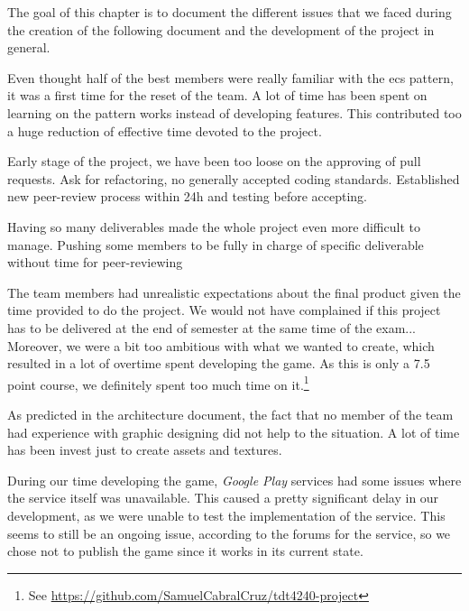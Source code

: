 The goal of this chapter is to document the different issues that we faced during the creation of the following document and the development of the project in general.

Even thought half of the best members were really familiar with the \gls{ecs} pattern, it was a first time for the reset of the team. A lot of time has been spent on learning on the pattern works instead of developing features. This contributed too a huge reduction of effective time devoted to the project.

Early stage of the project, we have been too loose on the approving of pull requests. Ask for refactoring, no generally accepted coding standards. Established new peer-review process within 24h and testing before accepting.

Having so many deliverables made the whole project even more difficult to manage. Pushing some members to be fully in charge of specific deliverable without time for peer-reviewing

The team members had unrealistic expectations about the final product given the time provided to do the project. We would not have complained if this project has to be delivered at the end of semester at the same time of the exam... Moreover, we were a bit too ambitious with what we wanted to create, which resulted in a lot of overtime spent developing the game. As this is only a 7.5 point course, we definitely spent too much time on it.\footnote{See \url{https://github.com/SamuelCabralCruz/tdt4240-project}}

As predicted in the architecture document, the fact that no member of the team had experience with graphic designing did not help to the situation. A lot of time has been invest just to create assets and textures.

During our time developing the game, \textit{Google Play} services had some issues where the service itself was unavailable. This caused a pretty significant delay in our development, as we were unable to test the implementation of the service. This seems to still be an ongoing issue, according to the forums for the service, so we chose not to publish the game since it works in its current state.
